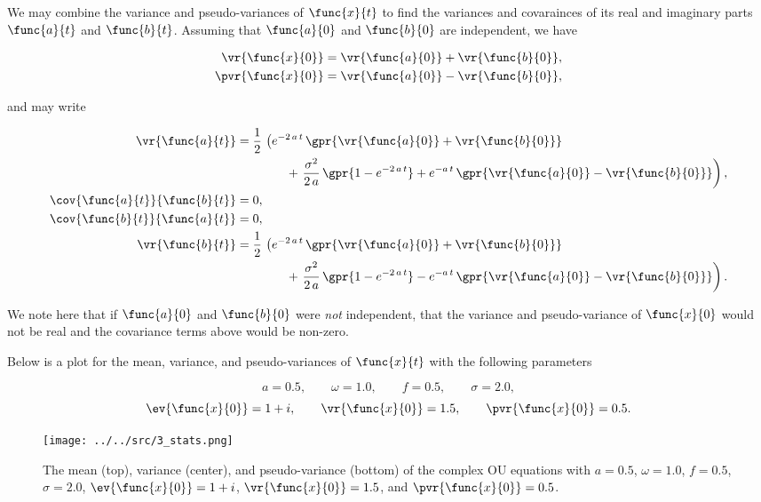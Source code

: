 We may combine the variance and pseudo-variances of $\func{x}{t}$ to find the variances and covarainces of its real and imaginary parts $\func{a}{t}$ and $\func{b}{t}$. Assuming that $\func{a}{0}$ and $\func{b}{0}$ are independent, we have 

\begin{subequations}
	\begin{align}
		\vr{\func{x}{0}} &= \vr{\func{a}{0}} + \vr{\func{b}{0}}, \\
		\pvr{\func{x}{0}} &= \vr{\func{a}{0}} - \vr{\func{b}{0}},
	\end{align}
\end{subequations}

and may write

\begin{subequations}
	\begin{align}
		\vr{\func{a}{t}} &= \frac{1}{2}\,\left(e^{-2\,a\,t}\,\gpr{\vr{\func{a}{0}} + \vr{\func{b}{0}}} \right. \nonumber \\
			&\qquad\qquad + \left.\frac{\sigma^2}{2\,a}\,\gpr{1 - e^{-2\,a\,t}} + e^{-a\,t}\,\gpr{\vr{\func{a}{0}} - \vr{\func{b}{0}}}\right), \\
		\cov{\func{a}{t}}{\func{b}{t}} &= 0, \\
		\cov{\func{b}{t}}{\func{a}{t}} &= 0, \\
		\vr{\func{b}{t}} &= \frac{1}{2}\,\left(e^{-2\,a\,t}\,\gpr{\vr{\func{a}{0}} + \vr{\func{b}{0}}}\right. \nonumber \\
			&\qquad\qquad + \left.\frac{\sigma^2}{2\,a}\,\gpr{1 - e^{-2\,a\,t}} - e^{-a\,t}\,\gpr{\vr{\func{a}{0}} - \vr{\func{b}{0}}}\right).
	\end{align}
\end{subequations}

We note here that if $\func{a}{0}$ and $\func{b}{0}$ were \emph{not} independent, that the variance and pseudo-variance of $\func{x}{0}$ would not be real and the covariance terms above would be non-zero.

Below is a plot for the mean, variance, and pseudo-variances of $\func{x}{t}$ with the following parameters

$$
a = 0.5,\qquad \omega = 1.0,\qquad f = 0.5,\qquad \sigma = 2.0,
$$
$$
\ev{\func{x}{0}} = 1 + i,\qquad \vr{\func{x}{0}} = 1.5,\qquad \pvr{\func{x}{0}} = 0.5.
$$
	
\begin{figure}[H]
	\centering
	\texttt{[image: ../../src/3\_stats.png]}
	\caption{The mean (top), variance (center), and pseudo-variance (bottom) of the complex OU equations with $a = 0.5$, $\omega = 1.0$, $f = 0.5$, $\sigma = 2.0$, $\ev{\func{x}{0}} = 1 + i$, $\vr{\func{x}{0}} = 1.5$, and $\pvr{\func{x}{0}} = 0.5$.}
	\label{fig:stats_3}
\end{figure}
		
